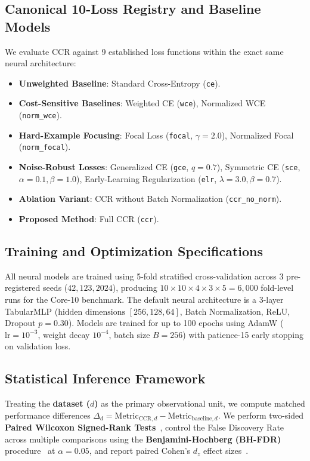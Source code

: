 \documentclass[preprint,12pt]{elsarticle}
\begin{document}
\subsection{Canonical 10-Loss Registry and Baseline Models}
We evaluate CCR against 9 established loss functions within the exact same neural architecture:
\begin{itemize}
    \item \textbf{Unweighted Baseline}: Standard Cross-Entropy (\texttt{ce}).
    \item \textbf{Cost-Sensitive Baselines}: Weighted CE (\texttt{wce}), Normalized WCE (\texttt{norm\_wce}).
    \item \textbf{Hard-Example Focusing}: Focal Loss (\texttt{focal}, $\gamma=2.0$), Normalized Focal (\texttt{norm\_focal}).
    \item \textbf{Noise-Robust Losses}: Generalized CE (\texttt{gce}, $q=0.7$), Symmetric CE (\texttt{sce}, $\alpha=0.1, \beta=1.0$), Early-Learning Regularization (\texttt{elr}, $\lambda=3.0, \beta=0.7$).
    \item \textbf{Ablation Variant}: CCR without Batch Normalization (\texttt{ccr\_no\_norm}).
    \item \textbf{Proposed Method}: Full CCR (\texttt{ccr}).
\end{itemize}

\subsection{Training and Optimization Specifications}
All neural models are trained using 5-fold stratified cross-validation across 3 pre-registered seeds ($42, 123, 2024$), producing $10 \times 10 \times 4 \times 3 \times 5 = 6,000$ fold-level runs for the Core-10 benchmark. The default neural architecture is a 3-layer TabularMLP ($\text{hidden dimensions } [256, 128, 64]$, Batch Normalization, ReLU, Dropout $p=0.30$). Models are trained for up to 100 epochs using AdamW ($\mathrm{lr}=10^{-3}$, weight decay $10^{-4}$, batch size $B=256$) with patience-15 early stopping on validation loss.

\subsection{Statistical Inference Framework}
Treating the \textbf{dataset ($d$)} as the primary observational unit, we compute matched performance differences $\Delta_d = \text{Metric}_{\mathrm{CCR}, d} - \text{Metric}_{\mathrm{baseline}, d}$. We perform two-sided \textbf{Paired Wilcoxon Signed-Rank Tests}~\cite{wilcoxon1945}, control the False Discovery Rate across multiple comparisons using the \textbf{Benjamini-Hochberg (BH-FDR)} procedure~\cite{benjamini1995controlling} at $\alpha = 0.05$, and report paired Cohen's $d_z$ effect sizes~\cite{cohen1988statistical}.
\end{document}
